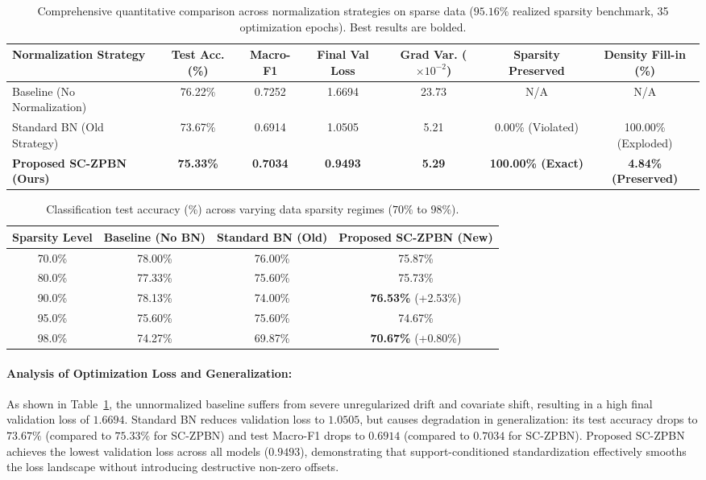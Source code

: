 \documentclass[twocolumn,10pt]{article}
\begin{document}
\begin{table}[t]
\centering
\small
\caption{Comprehensive quantitative comparison across normalization strategies on sparse data ($95.16\%$ realized sparsity benchmark, 35 optimization epochs). Best results are bolded.}
\label{tab:main_results}
\begin{tabular}{lcccccc}
\toprule
\textbf{Normalization Strategy} & \textbf{Test Acc. (\%)} & \textbf{Macro-F1} & \textbf{Final Val Loss} & \textbf{Grad Var. ($\times 10^{-2}$)} & \textbf{Sparsity Preserved} & \textbf{Density Fill-in (\%)} \\
\midrule
Baseline (No Normalization)     & 76.22\% & 0.7252 & 1.6694 & 23.73 & N/A & N/A \\
Standard BN (Old Strategy)      & 73.67\% & 0.6914 & 1.0505 & 5.21  & 0.00\% (Violated) & 100.00\% (Exploded) \\
\textbf{Proposed SC-ZPBN (Ours)} & \textbf{75.33\%} & \textbf{0.7034} & \textbf{0.9493} & \textbf{5.29} & \textbf{100.00\% (Exact)} & \textbf{4.84\% (Preserved)} \\
\bottomrule
\end{tabular}
\end{table}

\begin{table}[h]
\centering
\small
\caption{Classification test accuracy (\%) across varying data sparsity regimes ($70\%$ to $98\%$).}
\label{tab:sensitivity_results}
\begin{tabular}{cccc}
\toprule
\textbf{Sparsity Level} & \textbf{Baseline (No BN)} & \textbf{Standard BN (Old)} & \textbf{Proposed SC-ZPBN (New)} \\
\midrule
70.0\% & 78.00\% & 76.00\% & 75.87\% \\
80.0\% & 77.33\% & 75.60\% & 75.73\% \\
90.0\% & 78.13\% & 74.00\% & \textbf{76.53\%} (+2.53\%) \\
95.0\% & 75.60\% & 75.60\% & 74.67\% \\
98.0\% & 74.27\% & 69.87\% & \textbf{70.67\%} (+0.80\%) \\
\bottomrule
\end{tabular}
\end{table}

\paragraph{Analysis of Optimization Loss and Generalization:}
As shown in Table~\ref{tab:main_results}, the unnormalized baseline suffers from severe unregularized drift and covariate shift, resulting in a high final validation loss of $1.6694$. Standard BN reduces validation loss to $1.0505$, but causes degradation in generalization: its test accuracy drops to $73.67\%$ (compared to $75.33\%$ for SC-ZPBN) and test Macro-F1 drops to $0.6914$ (compared to $0.7034$ for SC-ZPBN). Proposed SC-ZPBN achieves the lowest validation loss across all models ($\mathbf{0.9493}$), demonstrating that support-conditioned standardization effectively smooths the loss landscape without introducing destructive non-zero offsets.
\end{document}
